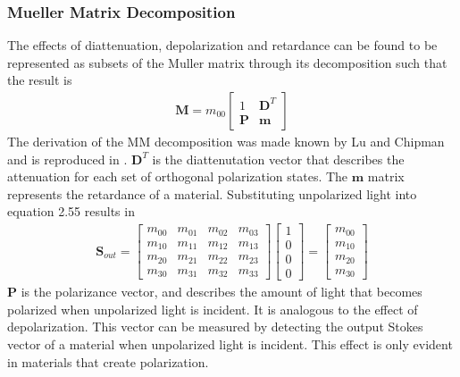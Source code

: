 \subsubsection{Mueller Matrix Decomposition}

The effects of diattenuation, depolarization and retardance can be found to be represented as subsets of the Muller matrix through its decomposition such that the result is
\begin{align}
    \mathbf{M} = m_{00}
    \begin{bmatrix}
        1 & \mathbf{D}^T \\
        \mathbf{P} & \mathbf{m}
    \end{bmatrix}
\end{align}
The derivation of the MM decomposition was made known by Lu and Chipman and is reproduced in \cite{polarizedlight}. $\mathbf{D}^T$ is the diattenutation vector that describes the attenuation for each set of orthogonal polarization states. The $\mathbf{m}$ matrix represents the retardance of a material. Substituting unpolarized light into equation 2.55 results in
%
\begin{align}
    \mathbf{S}_{out} =
    \begin{bmatrix}
            m_{00} & m_{01} & m_{02} & m_{03} \\
            m_{10} & m_{11} & m_{12} & m_{13} \\
            m_{20} & m_{21} & m_{22} & m_{23} \\
            m_{30} & m_{31} & m_{32} & m_{33}
    \end{bmatrix}
    \begin{bmatrix}
        1 \\
        0 \\
        0 \\
        0
    \end{bmatrix}
    =
    \begin{bmatrix}
        m_{00} \\
        m_{10} \\
        m_{20} \\
        m_{30}
    \end{bmatrix}
\end{align}
%
%
$\mathbf{P}$ is the polarizance vector, and describes the amount of light that becomes polarized when unpolarized light is incident.  It is analogous to the effect of depolarization.  This vector can be measured by detecting the output Stokes vector of a material when unpolarized light is incident.  This effect is only evident in materials that create polarization.
